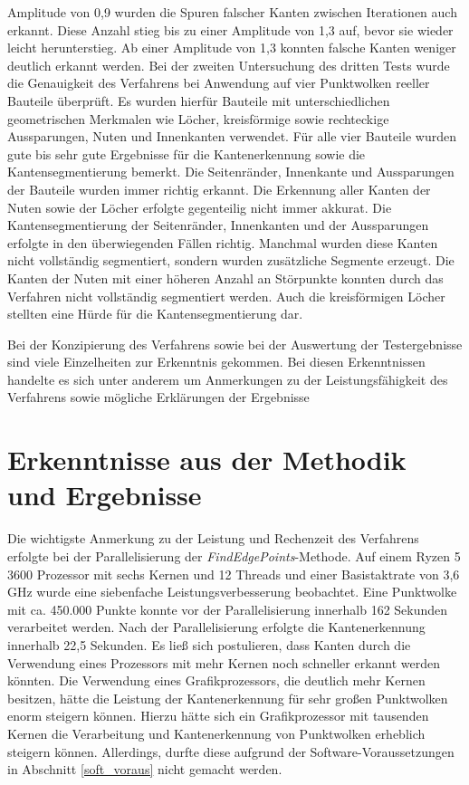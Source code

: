 Amplitude von 0,9 wurden die Spuren falscher Kanten zwischen Iterationen auch erkannt. Diese Anzahl stieg bis zu einer Amplitude von 1,3 auf, bevor sie wieder leicht herunterstieg. Ab einer Amplitude von 1,3 konnten falsche Kanten weniger deutlich erkannt werden. Bei der zweiten Untersuchung des dritten Tests wurde die Genauigkeit des Verfahrens bei Anwendung auf vier Punktwolken reeller Bauteile überprüft. Es wurden hierfür Bauteile mit unterschiedlichen geometrischen Merkmalen wie Löcher, kreisförmige sowie rechteckige Aussparungen, Nuten und Innenkanten verwendet. Für alle vier Bauteile wurden gute bis sehr gute Ergebnisse für die Kantenerkennung sowie die Kantensegmentierung bemerkt. Die Seitenränder, Innenkante und Aussparungen der Bauteile wurden immer richtig erkannt. Die Erkennung aller Kanten der Nuten sowie der Löcher erfolgte gegenteilig nicht immer akkurat. Die Kantensegmentierung der Seitenränder, Innenkanten und der Aussparungen erfolgte in den überwiegenden Fällen richtig. Manchmal wurden diese Kanten nicht vollständig segmentiert, sondern wurden zusätzliche Segmente erzeugt. Die Kanten der Nuten mit einer höheren Anzahl an Störpunkte konnten durch das Verfahren nicht vollständig segmentiert werden. Auch die kreisförmigen Löcher stellten eine Hürde für die Kantensegmentierung dar. 

Bei der Konzipierung des Verfahrens sowie bei der Auswertung der Testergebnisse sind viele Einzelheiten zur Erkenntnis gekommen. Bei diesen Erkenntnissen handelte es sich unter anderem um Anmerkungen zu der Leistungsfähigkeit des Verfahrens sowie mögliche Erklärungen der Ergebnisse

\section{Erkenntnisse aus der Methodik und Ergebnisse}

Die wichtigste Anmerkung zu der Leistung und Rechenzeit des Verfahrens erfolgte bei der Parallelisierung der \textit{FindEdgePoints}-Methode. Auf einem Ryzen 5 3600 Prozessor \autocite{noauthor_amd_2022} mit sechs Kernen und 12 Threads und einer Basistaktrate von 3,6 GHz wurde eine siebenfache Leistungsverbesserung beobachtet. Eine Punktwolke mit ca. 450.000 Punkte konnte vor der Parallelisierung innerhalb 162 Sekunden verarbeitet werden. Nach der Parallelisierung erfolgte die Kantenerkennung innerhalb 22,5 Sekunden. Es ließ sich postulieren, dass Kanten durch die Verwendung eines Prozessors mit mehr Kernen noch schneller erkannt werden könnten. Die Verwendung eines Grafikprozessors, die deutlich mehr Kernen besitzen, hätte die Leistung der Kantenerkennung für sehr großen Punktwolken enorm steigern können. Hierzu hätte sich ein Grafikprozessor mit tausenden Kernen die Verarbeitung und Kantenerkennung von Punktwolken erheblich steigern können. Allerdings, durfte diese aufgrund der Software-Voraussetzungen in Abschnitt \ref{soft_voraus} nicht gemacht werden.


